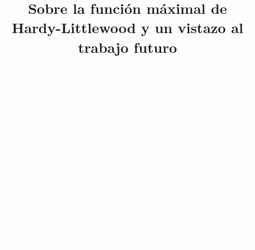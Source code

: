   \skip{}\baselineskip
\def\baselinestretch{1.05}
\parindent0pt

\def\thepage{}

\renewcommand{\footnoterule}{\textcolor{blue}{\rule{0.587\columnwidth}{0.02in}}\vspace*{5mm}}
\title{\color{White}\bfseries {\huge{Sobre la función máximal de Hardy-Littlewood y un vistazo al trabajo futuro}}\\\
	\normalsize\textcolor{White}{\huge{Andrés David Cadena Simons}} \\
	\textcolor{White}{\large{Trabajo realizado bajo la dirección del profesor Oscar Guillermo Riaño Castañeda y Ricardo Ariel Pastrán Ramírez.}} \\\
	\normalsize \textcolor{White}{\large{Smillero de Análisis Armónico y Ecuaciones Diferenciales Parciales, Departamento de Matemáticas, Universidad Nacional de Colombia}}\\\
	\textcolor{White}{\large{01 de diciembre de 2023}}\\\    
}
\author{}
\date{}
\advance
{}
\columnsep=2cm %
